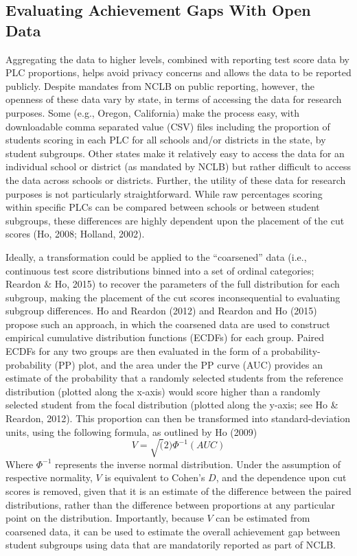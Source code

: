 \documentclass[man, fleqn, noextraspace]{apa6}
\theoremstyle{definition}
\theoremstyle{definition}
\theoremstyle{definition}
\theoremstyle{remark}
\begin{document}
\hypertarget{evaluating-achievement-gaps-with-open-data}{%
\subsection{Evaluating Achievement Gaps With Open
Data}\label{evaluating-achievement-gaps-with-open-data}}

Aggregating the data to higher levels, combined with reporting test
score data by PLC proportions, helps avoid privacy concerns and allows
the data to be reported publicly. Despite mandates from NCLB on public
reporting, however, the openness of these data vary by state, in terms
of accessing the data for research purposes. Some (e.g., Oregon,
California) make the process easy, with downloadable comma separated
value (CSV) files including the proportion of students scoring in each
PLC for all schools and/or districts in the state, by student subgroups.
Other states make it relatively easy to access the data for an
individual school or district (as mandated by NCLB) but rather difficult
to access the data across schools or districts. Further, the utility of
these data for research purposes is not particularly straightforward.
While raw percentages scoring within specific PLCs can be compared
between schools or between student subgroups, these differences are
highly dependent upon the placement of the cut scores (Ho, 2008;
Holland, 2002).

Ideally, a transformation could be applied to the \enquote{coarsened}
data (i.e., continuous test score distributions binned into a set of
ordinal categories; Reardon \& Ho, 2015) to recover the parameters of
the full distribution for each subgroup, making the placement of the cut
scores inconsequential to evaluating subgroup differences. Ho and
Reardon (2012) and Reardon and Ho (2015) propose such an approach, in
which the coarsened data are used to construct empirical cumulative
distribution functions (ECDFs) for each group. Paired ECDFs for any two
groups are then evaluated in the form of a probability-probability (PP)
plot, and the area under the PP curve (AUC) provides an estimate of the
probability that a randomly selected students from the reference
distribution (plotted along the x-axis) would score higher than a
randomly selected student from the focal distribution (plotted along the
y-axis; see Ho \& Reardon, 2012). This proportion can then be
transformed into standard-deviation units, using the following formula,
as outlined by Ho (2009) \begin{equation}
V = \sqrt(2)\Phi^{-1}(AUC)
\end{equation} Where \(\Phi^{-1}\) represents the inverse normal
distribution. Under the assumption of respective normality, \(V\) is
equivalent to Cohen's \(D\), and the dependence upon cut scores is
removed, given that it is an estimate of the difference between the
paired distributions, rather than the difference between proportions at
any particular point on the distribution. Importantly, because \(V\) can
be estimated from coarsened data, it can be used to estimate the overall
achievement gap between student subgroups using data that are
mandatorily reported as part of NCLB.
\end{document}
